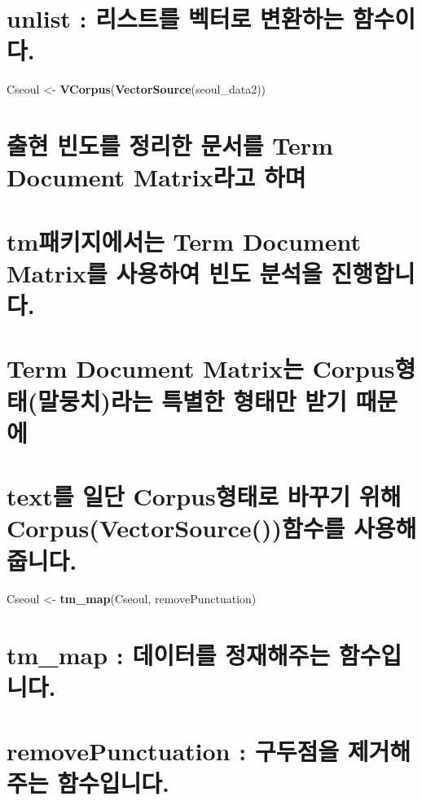 \documentclass[]{article}
\newenvironment{Shaded}{\begin{snugshade}}{\end{snugshade}}
\newcommand{\KeywordTok}[1]{\textcolor[rgb]{0.13,0.29,0.53}{\textbf{#1}}}
\newcommand{\StringTok}[1]{\textcolor[rgb]{0.31,0.60,0.02}{#1}}
\newcommand{\NormalTok}[1]{#1}
\begin{document}
\section{unlist : 리스트를 벡터로 변환하는 함수이다.}\label{unlist----.}

\begin{Shaded}
\begin{Highlighting}[]
\NormalTok{Cseoul <-}\StringTok{ }\KeywordTok{VCorpus}\NormalTok{(}\KeywordTok{VectorSource}\NormalTok{(seoul_data2))}
\end{Highlighting}
\end{Shaded}

\section{출현 빈도를 정리한 문서를 Term Document Matrix라고
하며}\label{----term-document-matrix-}

\section{tm패키지에서는 Term Document Matrix를 사용하여 빈도 분석을
진행합니다.}\label{tm-term-document-matrix----.}

\section{Term Document Matrix는 Corpus형태(말뭉치)라는 특별한 형태만
받기 때문에}\label{term-document-matrix-corpus----}

\section{text를 일단 Corpus형태로 바꾸기 위해
Corpus(VectorSource())함수를 사용해
줍니다.}\label{text--corpus---corpusvectorsource--.}

\begin{Shaded}
\begin{Highlighting}[]
\NormalTok{Cseoul <-}\StringTok{ }\KeywordTok{tm_map}\NormalTok{(Cseoul, removePunctuation)}
\end{Highlighting}
\end{Shaded}

\section{tm\_map : 데이터를 정재해주는 함수입니다.}\label{tm_map---.}

\section{removePunctuation : 구두점을 제거해주는
함수입니다.}\label{removepunctuation---.}
\end{document}
